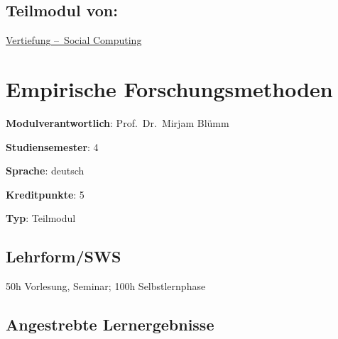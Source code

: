 \hypertarget{teilmodul-vonpathlabelmi-2017modulbeschreibungen-bachelorba_sc_projekt}{%
\section*{Teilmodul
von:\label{/mi-2017/modulbeschreibungen-bachelor/BA_SC_Projekt}}\label{teilmodul-vonpathlabelmi-2017modulbeschreibungen-bachelorba_sc_projekt}}

\hyperref[/mi-2017/modulbeschreibungen-bachelor/BA_Vertiefung_SocialComputing]{Vertiefung – Social Computing}

\hypertarget{empirische-forschungsmethodenpathlabelmi-2017modulbeschreibungen-bachelorba_sc_empirische-forschungsmethoden}{%
\chapter{Empirische
Forschungsmethoden\label{/mi-2017/modulbeschreibungen-bachelor/BA_SC_empirische-forschungsmethoden}}\label{empirische-forschungsmethodenpathlabelmi-2017modulbeschreibungen-bachelorba_sc_empirische-forschungsmethoden}}

\begin{modulHead}
\textbf{Modulverantwortlich}: Prof.~Dr.~Mirjam
Blümm
\end{modulHead}
\begin{modulHead}
\textbf{Studiensemester}:
4
\end{modulHead}
\begin{modulHead}
\textbf{Sprache}:
deutsch
\end{modulHead}
\begin{modulHead}
\textbf{Kreditpunkte}:
5
\end{modulHead}
\begin{modulHead}
\textbf{Typ}:
Teilmodul
\end{modulHead}


\hypertarget{lehrformswspathlabelmi-2017modulbeschreibungen-bachelorba_sc_empirische-forschungsmethoden}{%
\section*{Lehrform/SWS\label{/mi-2017/modulbeschreibungen-bachelor/BA_SC_empirische-forschungsmethoden}}\label{lehrformswspathlabelmi-2017modulbeschreibungen-bachelorba_sc_empirische-forschungsmethoden}}

50h Vorlesung, Seminar; 100h Selbstlernphase

\hypertarget{angestrebte-lernergebnissepathlabelmi-2017modulbeschreibungen-bachelorba_sc_empirische-forschungsmethoden}{%
\section*{Angestrebte
Lernergebnisse\label{/mi-2017/modulbeschreibungen-bachelor/BA_SC_empirische-forschungsmethoden}}\label{angestrebte-lernergebnissepathlabelmi-2017modulbeschreibungen-bachelorba_sc_empirische-forschungsmethoden}}

